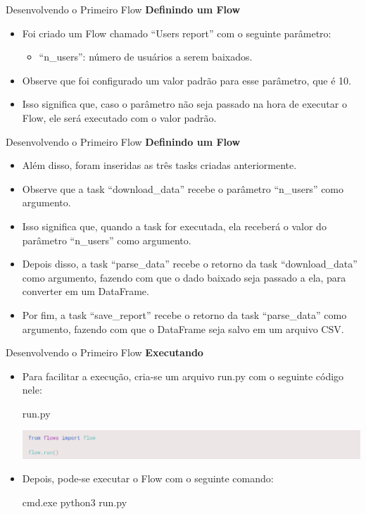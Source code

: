 \documentclass[t,serif]{beamer}
\begin{document}
	\begin{frame}{Desenvolvendo o Primeiro Flow}
		\textbf{Definindo um Flow}
		\begin{itemize}
			\item Foi criado um Flow chamado ``Users report'' com o seguinte parâmetro:
			\begin{itemize}
				\item ``n\_users'': número de usuários a serem baixados.
			\end{itemize}
			\item Observe que foi configurado um valor padrão para esse parâmetro, que é 10.
			\item Isso significa que, caso o parâmetro não seja passado na hora de executar o Flow, ele será executado com o valor padrão.
		\end{itemize}
	\end{frame}
	
	\begin{frame}{Desenvolvendo o Primeiro Flow}
		\textbf{Definindo um Flow}
		\begin{itemize}
			\item Além disso, foram inseridas as três tasks criadas anteriormente.
			\item Observe que a task ``download\_data'' recebe o parâmetro ``n\_users'' como argumento.
			\item Isso significa que, quando a task for executada, ela receberá o valor do parâmetro ``n\_users'' como argumento.
			\item Depois disso, a task ``parse\_data'' recebe o retorno da task ``download\_data'' como argumento, fazendo com que o dado baixado seja passado a ela, para converter em um DataFrame.
			\item Por fim, a task ``save\_report'' recebe o retorno da task ``parse\_data'' como argumento, fazendo com que o DataFrame seja salvo em um arquivo CSV.
		\end{itemize}
	\end{frame}
	
	\begin{frame}{Desenvolvendo o Primeiro Flow}
		\textbf{Executando}
		\begin{itemize}
			\item Para facilitar a execução, cria-se um arquivo run.py com o seguinte código nele:
			\begin{block}{run.py}
				\begin{center}
					\includegraphics[width=\linewidth]{figs/2_12.png}
				\end{center}
			\end{block}
			\item Depois, pode-se executar o Flow com o seguinte comando:
			\begin{block}{cmd.exe}
				python3 run.py
			\end{block}
		\end{itemize}
	\end{frame}
	
\end{document}
